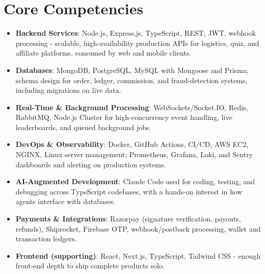 \documentclass[11pt,a4paper,sans]{moderncv}
\begin{document}
\section{Core Competencies}
\vspace{1pt}
\begin{itemize}

\item \textbf{Backend Services}: Node.js, Express.js, TypeScript, REST, JWT, webhook processing - scalable, high-availability production APIs for logistics, quiz, and affiliate platforms, consumed by web and mobile clients.

\item \textbf{Databases}: MongoDB, PostgreSQL, MySQL with Mongoose and Prisma; schema design for order, ledger, commission, and fraud-detection systems, including migrations on live data.

\item \textbf{Real-Time \& Background Processing}: WebSockets/Socket.IO, Redis, RabbitMQ, Node.js Cluster for high-concurrency event handling, live leaderboards, and queued background jobs.

\item \textbf{DevOps \& Observability}: Docker, GitHub Actions, CI/CD, AWS EC2, NGINX, Linux server management; Prometheus, Grafana, Loki, and Sentry dashboards and alerting on production systems.

\item \textbf{AI-Augmented Development}: Claude Code used for coding, testing, and debugging across TypeScript codebases, with a hands-on interest in how agents interface with databases.

\item \textbf{Payments \& Integrations}: Razorpay (signature verification, payouts, refunds), Shiprocket, Firebase OTP, webhook/postback processing, wallet and transaction ledgers.

\item \textbf{Frontend (supporting)}: React, Next.js, TypeScript, Tailwind CSS - enough front-end depth to ship complete products solo.

\end{itemize}

\end{document}
